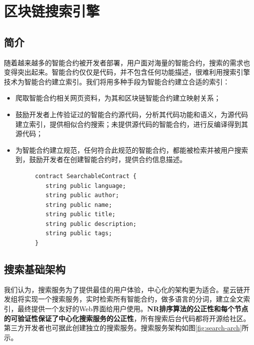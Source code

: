 \section{区块链搜索引擎}
\label{sec:search}

\subsection{简介}

随着越来越多的智能合约被开发者部署，用户面对海量的智能合约，搜索的需求也变得突出起来。智能合约仅仅是代码，并不包含任何功能描述，很难利用搜索引擎技术为智能合约建立索引。我们将用多种手段为智能合约建立合适的索引：
\begin{itemize}
	\item 爬取智能合约相关网页资料，为其和区块链智能合约建立映射关系；
	\item 鼓励开发者上传验证过的智能合约源代码，分析其代码功能和语义，为源代码建立索引，提供相似合约搜索；未提供源代码的智能合约，进行反编译得到其源代码；
	\item 为智能合约建立规范，任何符合此规范的智能合约，都能被检索并被用户搜索到，鼓励开发者在创建智能合约时，提供合约信息描述。 \\

	\begin{figure}[ht]
  	\centering
  	\begin{minipage}{.4\linewidth}
	\begin{lstlisting}[frame=single]
contract SearchableContract {
   string public language;
   string public author;
   string public name;
   string public title;
   string public description;
   string public tags;
}
	\end{lstlisting}
  	\end{minipage}
	\end{figure}

\end{itemize}

\subsection{搜索基础架构}

我们认为，搜索服务为了提供最佳的用户体验，中心化的架构更为适合。星云链开发组将实现一个搜索服务，实时检索所有智能合约，做多语言的分词，建立全文索引，最终提供一个友好的Web界面给用户使用。\textbf{NR排序算法的公正性和每个节点的可验证性保证了中心化搜索服务的公正性}，所有搜索后台代码都将开源给社区。第三方开发者也可据此创建独立的搜索服务。搜索服务架构如图\ref{fig:search-arch}所示。

